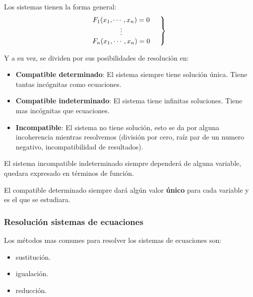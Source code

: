     Los sistemas tienen la forma general:
    \begin{equation}
        \left.
        \begin{matrix}
            F_1(x_1,\cdots,x_n)=0\\
            \vdots\\
            F_n(x_1,\cdots,x_n)=0
        \end{matrix}
        \hspace*{0.5cm}\right\rbrace
    \end{equation}

    Y a su vez, se dividen por sus posibilidades de resolución en:

    \begin{itemize}
        \item \textbf{Compatible determinado}: El sistema siempre tiene solución única.
            Tiene tantas incógnitas como ecuaciones.

        \item \textbf{Compatible indeterminado}: El sistema tiene infinitas soluciones.
            Tiene mas incógnitas que ecuaciones.

        \item \textbf{Incompatible}: El sistema no tiene solución, esto se da por alguna
            incoherencia mientras resolvemos (división por cero, raíz par de un numero
            negativo, incompatibilidad de resultados).
    \end{itemize}

    El sistema incompatible indeterminado siempre dependerá de alguna variable,
    quedara expresado en términos de función.

    El compatible determinado siempre dará algún valor \textbf{único} para cada
    variable y es el que se estudiara.

    \subsubsection{Resolución sistemas de ecuaciones}

    Los métodos mas comunes para resolver los sistemas de ecuaciones son:

    \begin{itemize}
        \item sustitución.
        \item igualación.
        \item reducción.
    \end{itemize}

